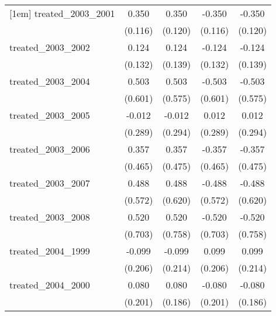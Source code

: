 {\begin{tabular}{l*{4}{c}}
[1em]
treated\_2003\_2001&       0.350\sym{**} &       0.350\sym{**} &      -0.350\sym{**} &      -0.350\sym{**} \\
            &     (0.116)         &     (0.120)         &     (0.116)         &     (0.120)         \\
[1em]
treated\_2003\_2002&       0.124         &       0.124         &      -0.124         &      -0.124         \\
            &     (0.132)         &     (0.139)         &     (0.132)         &     (0.139)         \\
[1em]
treated\_2003\_2004&       0.503         &       0.503         &      -0.503         &      -0.503         \\
            &     (0.601)         &     (0.575)         &     (0.601)         &     (0.575)         \\
[1em]
treated\_2003\_2005&      -0.012         &      -0.012         &       0.012         &       0.012         \\
            &     (0.289)         &     (0.294)         &     (0.289)         &     (0.294)         \\
[1em]
treated\_2003\_2006&       0.357         &       0.357         &      -0.357         &      -0.357         \\
            &     (0.465)         &     (0.475)         &     (0.465)         &     (0.475)         \\
[1em]
treated\_2003\_2007&       0.488         &       0.488         &      -0.488         &      -0.488         \\
            &     (0.572)         &     (0.620)         &     (0.572)         &     (0.620)         \\
[1em]
treated\_2003\_2008&       0.520         &       0.520         &      -0.520         &      -0.520         \\
            &     (0.703)         &     (0.758)         &     (0.703)         &     (0.758)         \\
[1em]
treated\_2004\_1999&      -0.099         &      -0.099         &       0.099         &       0.099         \\
            &     (0.206)         &     (0.214)         &     (0.206)         &     (0.214)         \\
[1em]
treated\_2004\_2000&       0.080         &       0.080         &      -0.080         &      -0.080         \\
            &     (0.201)         &     (0.186)         &     (0.201)         &     (0.186)         \\

\end{tabular}}
